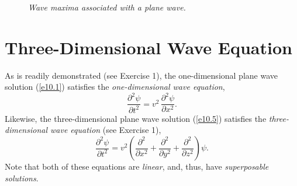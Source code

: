 \begin{figure}
\epsfysize=2.5in
\centerline{}
\caption{\em Wave maxima associated with a plane wave.}\label{f10.2}   
\end{figure}

\section{Three-Dimensional Wave Equation}\label{s10.2}
As is readily demonstrated (see Exercise 1), the one-dimensional plane wave solution (\ref{e10.1}) satisfies the {\em one-dimen\-sional wave equation},
\begin{equation}\label{e10.8}
\frac{\partial^2\psi}{\partial t^2} = v^2\,\frac{\partial^2\psi}{\partial x^2}.
\end{equation}
Likewise, the three-dimensional plane wave solution (\ref{e10.5}) satisfies the {\em three-dimensional
wave equation}\/  (see Exercise 1),
\begin{equation}\label{e10.9}
\frac{\partial^2\psi}{\partial t^2} = v^2\left(\frac{\partial^2}{\partial x^2}+\frac{\partial^2}{\partial y^2}+\frac{\partial^2}{\partial z^2}\right)\psi.
\end{equation}
Note that both of these equations are {\em linear}, and, thus, have {\em superposable solutions}. 

